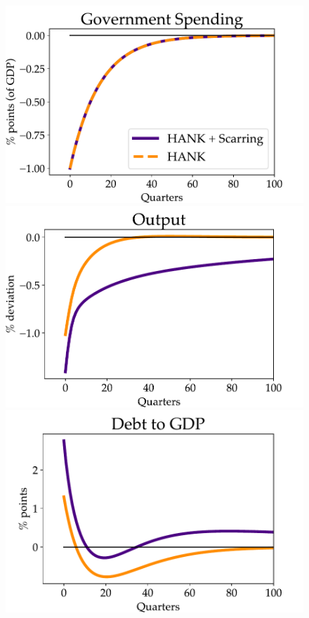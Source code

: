 \begin{figure}[!t]
\begin{center}
\begin{minipage}{0.5\textwidth}
\includegraphics[scale=.5]{text/chapter1/Figures/Fiscal_Consolidation/Government_spending_FC}
\end{minipage}\hspace*{\fill}
\begin{minipage}{0.5\textwidth}
\includegraphics[scale=.5]{text/chapter1/Figures/Fiscal_Consolidation/Output_FC}
\end{minipage}
\medskip
\begin{minipage}{0.5\textwidth}
\includegraphics[scale=.5]{text/chapter1/Figures/Fiscal_Consolidation/debt to GDP_FC}

\end{minipage}
\end{center}
\end{figure}
